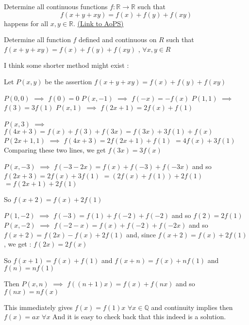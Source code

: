 \begin{problem}
	Determine all continuous functions $f: \mathbb R \to \mathbb R$ such that
\[ f(x + y + xy) = f(x) + f(y) + f(xy)\]
happens for all $x,y \in \mathbb R$.
	\flushright \href{https://artofproblemsolving.com/community/c6h320307}{(Link to AoPS)}
\end{problem}



\begin{solution}
	\begin{tcolorbox}Determine all function $ f$ defined and continuous on $ R$ such that
$ f(x + y + xy) = f(x) + f(y) + f(xy)$ , $ \forall x,y \in R$\end{tcolorbox}

I think some shorter method might exist :

Let $ P(x,y)$ be the assertion $ f(x+y+xy)=f(x)+f(y)+f(xy)$

$ P(0,0)$ $ \implies$ $ f(0)=0$
$ P(x,-1)$ $ \implies$ $ f(-x)=-f(x)$
$ P(1,1)$ $ \implies$ $ f(3)=3f(1)$
$ P(x,1)$ $ \implies$ $ f(2x+1)=2f(x)+f(1)$

$ P(x,3)$ $ \implies$ $ f(4x+3)=f(x)+f(3)+f(3x)=f(3x)+3f(1)+f(x)$
$ P(2x+1,1)$ $ \implies$ $ f(4x+3)=2f(2x+1)+f(1)$ $ =4f(x)+3f(1)$
Comparing these two lines, we get $ f(3x)=3f(x)$

$ P(x,-3)$ $ \implies$ $ f(-3-2x)=f(x)+f(-3)+f(-3x)$ and so $ f(2x+3)=2f(x)+3f(1)$ $ =(2f(x)+f(1))+2f(1)$ $ =f(2x+1)+2f(1)$

So $ f(x+2)=f(x)+2f(1)$

$ P(1,-2)$ $ \implies$ $ f(-3)=f(1)+f(-2)+f(-2)$ and so $ f(2)=2f(1)$
$ P(x,-2)$ $ \implies$ $ f(-2-x)=f(x)+f(-2)+f(-2x)$ and so $ f(x+2)=f(2x)-f(x)+2f(1)$ and, since $ f(x+2)=f(x)+2f(1)$, we get : $ f(2x)=2f(x)$

So $ f(x+1)=f(x)+f(1)$ and $ f(x+n)=f(x)+nf(1)$ and $ f(n)=nf(1)$

Then $ P(x,n)$ $ \implies$ $ f((n+1)x)=f(x)+f(nx)$ and so $ f(nx)=nf(x)$

This immediately gives $ f(x)=f(1)x$ $ \forall x\in\mathbb Q$ and continuity implies then $ \boxed{f(x)=ax}$ $ \forall x$
And it is easy to check back that this indeed is a solution.
\end{solution}



